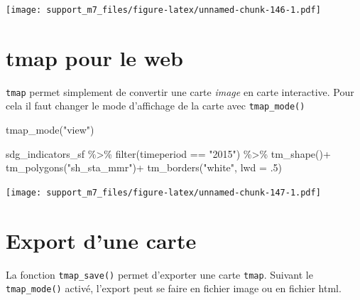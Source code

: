 \documentclass[
]{book}
\newenvironment{Shaded}{\begin{snugshade}}{\end{snugshade}}
\newcommand{\AttributeTok}[1]{\textcolor[rgb]{0.77,0.63,0.00}{#1}}
\newcommand{\DecValTok}[1]{\textcolor[rgb]{0.00,0.00,0.81}{#1}}
\newcommand{\FunctionTok}[1]{\textcolor[rgb]{0.00,0.00,0.00}{#1}}
\newcommand{\NormalTok}[1]{#1}
\newcommand{\SpecialCharTok}[1]{\textcolor[rgb]{0.00,0.00,0.00}{#1}}
\newcommand{\StringTok}[1]{\textcolor[rgb]{0.31,0.60,0.02}{#1}}
\begin{document}
\texttt{[image: support\_m7\_files/figure-latex/unnamed-chunk-146-1.pdf]}

\hypertarget{tmap-pour-le-web}{%
\section{tmap pour le web}\label{tmap-pour-le-web}}

\texttt{tmap} permet simplement de convertir une carte \emph{image} en carte interactive. Pour cela il faut changer le mode d'affichage de la carte avec \texttt{tmap\_mode()}

\begin{Shaded}
\begin{Highlighting}[]
\FunctionTok{tmap\_mode}\NormalTok{(}\StringTok{"view"}\NormalTok{)}

\NormalTok{sdg\_indicators\_sf }\SpecialCharTok{\%\textgreater{}\%} 
  \FunctionTok{filter}\NormalTok{(timeperiod }\SpecialCharTok{==} \StringTok{"2015"}\NormalTok{) }\SpecialCharTok{\%\textgreater{}\%} 
  \FunctionTok{tm\_shape}\NormalTok{()}\SpecialCharTok{+}
  \FunctionTok{tm\_polygons}\NormalTok{(}\StringTok{"sh\_sta\_mmr"}\NormalTok{)}\SpecialCharTok{+}
  \FunctionTok{tm\_borders}\NormalTok{(}\StringTok{"white"}\NormalTok{, }\AttributeTok{lwd =}\NormalTok{ .}\DecValTok{5}\NormalTok{)}
\end{Highlighting}
\end{Shaded}

\texttt{[image: support\_m7\_files/figure-latex/unnamed-chunk-147-1.pdf]}

\hypertarget{export-dune-carte}{%
\section{Export d'une carte}\label{export-dune-carte}}

La fonction \texttt{tmap\_save()} permet d'exporter une carte \texttt{tmap}. Suivant le \texttt{tmap\_mode()} activé, l'export peut se faire en fichier image ou en fichier html.
\end{document}
